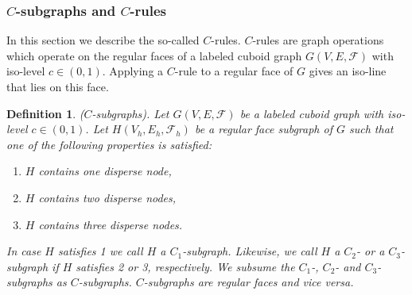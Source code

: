 \documentclass[a4paper,11pt]{article}
\newtheorem{definition}[theorem]{Definition}
\begin{document}
\subsubsection{$C$-subgraphs and $C$-rules}
In this section we describe the so-called $C$-rules. $C$-rules are graph operations which operate
on the regular faces of a labeled cuboid graph $G(V,E,\mathcal{F})$ with iso-level $c\in (0,1)$.
Applying a $C$-rule to a regular face of $G$ gives an iso-line that lies on this face.

\begin{definition}($C$-subgraphs). Let $G(V,E,\mathcal{F})$ be a labeled cuboid graph with
iso-level $c\in (0,1)$. Let $H(V_h,E_h,\mathcal{F}_h)$ be a regular face subgraph of $G$ such that
one of the following properties is satisfied:
\begin{enumerate}
\item $H$ contains one disperse node,
\item $H$ contains two disperse nodes,
\item $H$ contains three disperse nodes.
\end{enumerate}
In case $H$ satisfies 1 we call $H$ a $C_1$-subgraph. Likewise, we call $H$ a $C_2$- or a $C_3$-subgraph
if $H$ satisfies 2 or 3, respectively. We subsume the $C_1$-, $C_2$- and $C_3$-subgraphs as $C$-subgraphs.
$C$-subgraphs are regular faces and vice versa.
\label{def:iso-path-22}
\end{definition}
\end{document}
